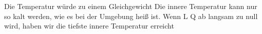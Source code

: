 Die Temperatur würde zu einem Gleichgewicht  
Die innere Temperatur kann nur so kalt werden, wie es bei der Umgebung heiß ist. Wenn L Q ab langsam zu null wird, haben wir die tiefste innere Temperatur erreicht